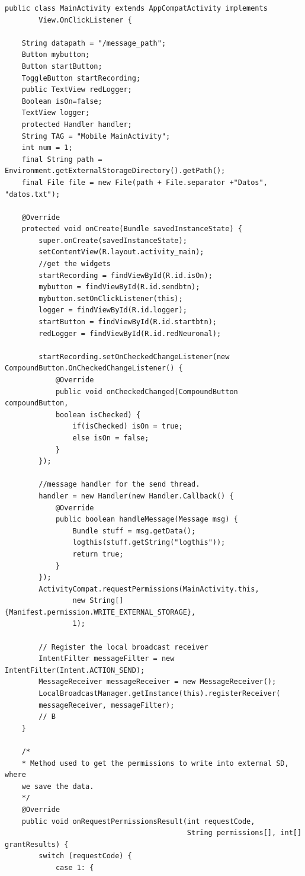 \documentclass[12pt]{book}
\numberwithin{equation}{section}
\begin{document}
\begin{appendices}
\begin{verbatim}
public class MainActivity extends AppCompatActivity implements
        View.OnClickListener {

    String datapath = "/message_path";
    Button mybutton;
    Button startButton;
    ToggleButton startRecording;
    public TextView redLogger;
    Boolean isOn=false;
    TextView logger;
    protected Handler handler;
    String TAG = "Mobile MainActivity";
    int num = 1;
    final String path = Environment.getExternalStorageDirectory().getPath();
    final File file = new File(path + File.separator +"Datos", "datos.txt");

    @Override
    protected void onCreate(Bundle savedInstanceState) {
        super.onCreate(savedInstanceState);
        setContentView(R.layout.activity_main);
        //get the widgets
        startRecording = findViewById(R.id.isOn);
        mybutton = findViewById(R.id.sendbtn);
        mybutton.setOnClickListener(this);
        logger = findViewById(R.id.logger);
        startButton = findViewById(R.id.startbtn);
        redLogger = findViewById(R.id.redNeuronal);

        startRecording.setOnCheckedChangeListener(new CompoundButton.OnCheckedChangeListener() {
            @Override
            public void onCheckedChanged(CompoundButton compoundButton, 
            boolean isChecked) {
                if(isChecked) isOn = true;
                else isOn = false;
            }
        });

        //message handler for the send thread.
        handler = new Handler(new Handler.Callback() {
            @Override
            public boolean handleMessage(Message msg) {
                Bundle stuff = msg.getData();
                logthis(stuff.getString("logthis"));
                return true;
            }
        });
        ActivityCompat.requestPermissions(MainActivity.this,
                new String[]{Manifest.permission.WRITE_EXTERNAL_STORAGE},
                1);

        // Register the local broadcast receiver
        IntentFilter messageFilter = new IntentFilter(Intent.ACTION_SEND);
        MessageReceiver messageReceiver = new MessageReceiver();
        LocalBroadcastManager.getInstance(this).registerReceiver(
        messageReceiver, messageFilter);
        // B
    }

    /*
    * Method used to get the permissions to write into external SD, where 
    we save the data.
    */
    @Override
    public void onRequestPermissionsResult(int requestCode,
                                           String permissions[], int[] grantResults) {
        switch (requestCode) {
            case 1: {


\end{verbatim}
\end{appendices}
\end{document}
